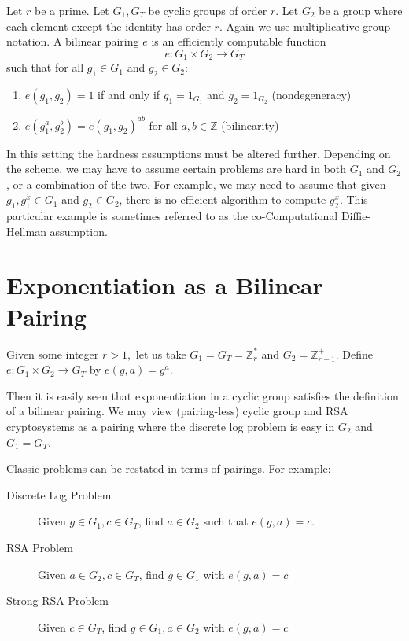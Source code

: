 Let $r$ be a prime.
Let $G_1, G_T$ be cyclic groups of order $r$.
Let $G_2$ be a group where each element except the identity has order $r$.
Again we use multiplicative group notation.
A bilinear pairing $e$ is an efficiently computable function
\[
e:G_1 \times G_2 \rightarrow G_T
\]
such that for all $g_1 \in G_1$ and $g_2 \in G_2$:
\begin{enumerate}
\item
$e(g_1,g_2) = 1$ if and only if $g_1 = 1_{G_1}$ and $g_2 = 1_{G_2}$
(nondegeneracy)
\item
$e(g_1^a, g_2^b) = e(g_1,g_2)^{a b}$ for all $a, b \in \mathbb{Z}$
(bilinearity)
\end{enumerate}

In this setting the hardness assumptions must be altered further.
Depending on the scheme, we may have to assume certain problems are hard in
both $G_1$ and $G_2$, or a combination of the two. For example, we may
need to assume that given $g_1, g_1^x \in G_1$ and $g_2 \in G_2$,
there is no efficient algorithm to compute $g_2^x$. This particular
example is sometimes referred to as
the co-Computational Diffie-Hellman assumption.

\section{Exponentiation as a Bilinear Pairing}

Given some integer $r > 1,$
let us take $G_1 = G_T = \mathbb{Z}_r^*$ and $G_2 = \mathbb{Z}_{r-1}^+$.
Define $e:G_1\times G_2 \rightarrow G_T$ by $e(g, a)= g^a$.

Then it is easily seen that exponentiation in a cyclic group satisfies
the definition of a bilinear
pairing. We may view (pairing-less) cyclic group and RSA cryptosystems
as a pairing where the discrete log problem is easy in $G_2$ and $G_1 = G_T$.

Classic problems can be restated in terms of
pairings. For example:

\begin{description}
\item[Discrete Log Problem]
Given $g \in G_1, c \in G_T$, find $a \in G_2$ such that $e(g,a) = c$.
\item[RSA Problem]
Given $a \in G_2, c \in G_T$, find $g \in G_1$ with
$e(g,a) = c$
\item[Strong RSA Problem]
Given $c \in G_T$, find $g \in G_1, a\in G_2$ with
$e(g,a) = c$
\end{description}

